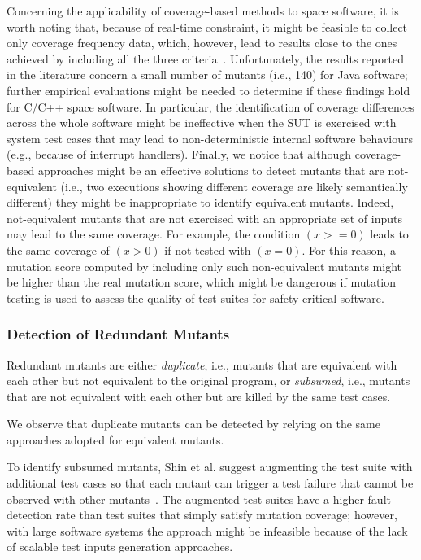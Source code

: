 Concerning the applicability of coverage-based methods to space software, it is worth noting that, because of real-time constraint, it might be feasible to collect only coverage frequency data, which, however, lead to results close to the ones achieved by including all the three criteria~\cite{schuler2013covering}.
Unfortunately, the  results reported in the literature concern a small number of mutants (i.e., 140) for Java software; further empirical evaluations might be needed to determine if these findings hold for C/C++ space software. 
In particular, the identification of coverage differences across the whole software might be ineffective when the SUT is exercised with system test cases that may lead to non-deterministic internal software behaviours (e.g., because of interrupt handlers). Finally, we notice that although coverage-based approaches might be an effective solutions to detect mutants that are not-equivalent (i.e., two executions showing different coverage are likely semantically different) they might be inappropriate to identify equivalent mutants. Indeed, not-equivalent mutants that are not exercised with an appropriate set of inputs may lead to the same coverage. For example, the condition $(x >= 0)$ leads to the same coverage of $(x > 0)$ if not tested with $(x=0)$. For this reason, a mutation score computed by including only such non-equivalent mutants might be higher than the real mutation score, which might be dangerous if mutation testing is used to assess the quality of test suites for safety critical software.

\subsubsection{Detection of Redundant Mutants}

Redundant mutants are either \emph{duplicate}, i.e., mutants that are equivalent with each other but not equivalent to the original program, or \emph{subsumed}, i.e., mutants that are not equivalent with each other but are killed by the same test cases. 

We observe that duplicate mutants can be detected by relying on the same approaches adopted for equivalent mutants. 

To identify subsumed mutants, Shin et al. suggest augmenting the test suite with additional test cases so that each mutant can trigger a test failure that cannot be observed with other mutants~\cite{Shin:TSE:DCriterion:2018}. 
The augmented test suites have a higher
 fault detection rate than test suites that simply satisfy mutation coverage; however, with large software systems the approach might be infeasible because of the lack of scalable test inputs generation approaches.


